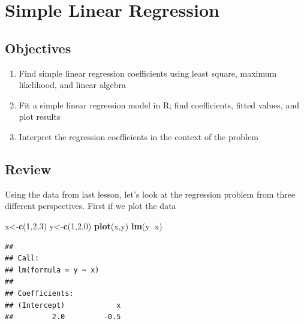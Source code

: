 \documentclass[]{book}
\newenvironment{Shaded}{\begin{snugshade}}{\end{snugshade}}
\newcommand{\KeywordTok}[1]{\textcolor[rgb]{0.13,0.29,0.53}{\textbf{#1}}}
\newcommand{\DataTypeTok}[1]{\textcolor[rgb]{0.13,0.29,0.53}{#1}}
\newcommand{\DecValTok}[1]{\textcolor[rgb]{0.00,0.00,0.81}{#1}}
\newcommand{\StringTok}[1]{\textcolor[rgb]{0.31,0.60,0.02}{#1}}
\newcommand{\CommentTok}[1]{\textcolor[rgb]{0.56,0.35,0.01}{\textit{#1}}}
\newcommand{\OperatorTok}[1]{\textcolor[rgb]{0.81,0.36,0.00}{\textbf{#1}}}
\newcommand{\NormalTok}[1]{#1}
\providecommand{\tightlist}{%
  \setlength{\itemsep}{0pt}\setlength{\parskip}{0pt}}
\theoremstyle{definition}
\theoremstyle{definition}
\theoremstyle{definition}
\theoremstyle{remark}
\begin{document}
\hypertarget{L30}{\section{Simple Linear Regression}\label{L30}}

\subsection{Objectives}\label{objectives-27}

\begin{enumerate}
\def\labelenumi{\arabic{enumi}.}
\tightlist
\item
  Find simple linear regression coefficients using least square, maximum
  likelihood, and linear algebra\\
\item
  Fit a simple linear regression model in R; find coefficients, fitted
  values, and plot results\\
\item
  Interpret the regression coefficients in the context of the problem
\end{enumerate}

\subsection{Review}\label{review-8}

Using the data from last lesson, let's look at the regression problem
from three different perspectives. First if we plot the data

\begin{Shaded}
\begin{Highlighting}[]
\NormalTok{x<-}\KeywordTok{c}\NormalTok{(}\DecValTok{1}\NormalTok{,}\DecValTok{2}\NormalTok{,}\DecValTok{3}\NormalTok{)}
\NormalTok{y<-}\KeywordTok{c}\NormalTok{(}\DecValTok{1}\NormalTok{,}\DecValTok{2}\NormalTok{,}\DecValTok{0}\NormalTok{)}
\KeywordTok{plot}\NormalTok{(x,y)}
\KeywordTok{lm}\NormalTok{(y}\OperatorTok{~}\NormalTok{x)}
\end{Highlighting}
\end{Shaded}

\begin{verbatim}
## 
## Call:
## lm(formula = y ~ x)
## 
## Coefficients:
## (Intercept)            x  
##         2.0         -0.5
\end{verbatim}

\begin{Shaded}
\end{Shaded}
\end{document}

